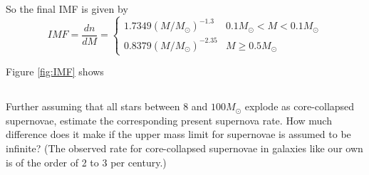 So the final IMF is given by
\begin{equation*}
    IMF = \frac{dn}{dM} = 
    \begin{cases} 
      1.7349(M/M_\odot)^{-1.3}     & 0.1M_\odot < M < 0.1M_\odot\\
      0.8379(M/M_\odot)^{-2.35}    & M \geq 0.5M_\odot
   \end{cases}
\end{equation*}

Figure \ref{fig:IMF} shows 


\subsection{}
Further assuming that all stars between $8$ and $100M_\odot$ explode as core-collapsed supernovae, estimate the corresponding present supernova rate. 
How much difference does it make if the upper mass limit for supernovae is assumed to be infinite? (The observed rate for
core-collapsed supernovae in galaxies like our own is of the order of 2 to 3 per century.)




